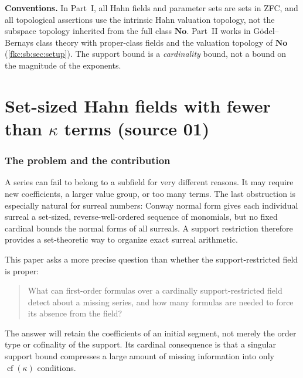 \documentclass[11pt,letterpaper]{article}
\numberwithin{equation}{section}
\theoremstyle{definition}
\theoremstyle{remark}
\newcommand{\No}{\mathbf{No}}
\newcommand{\cf}{\operatorname{cf}}
\begin{document}
\begin{abstract}
The report is built from two manuscripts: Part~I (Sections 1--12) from one pinned at repository commit \texttt{465a54b}, Part~II (Sections 13--26) from one pinned at \texttt{343dc2c}.  record their provenance, notation conventions and relation to neighbouring reports; \cref{fkc:subsec:nonclaims,fkc:sb:sub:nonclaims} collect their non-claims.
\end{abstract}
\vfill
\noindent\small\textbf{Conventions.} In Part~I, all Hahn fields and parameter sets are sets in ZFC, and all topological assertions use the intrinsic Hahn valuation topology, not the subspace topology inherited from the full class $\No$. Part~II works in G\"odel--Bernays class theory with proper-class fields and the valuation topology of $\No$ (\cref{fkc:sb:sec:setup}). The support bound is a \emph{cardinality} bound, not a bound on the magnitude of the exponents.
\clearpage
\begingroup
\small
\setlength{\parskip}{0pt}
\tableofcontents
\endgroup
\clearpage

\part{Set-sized Hahn fields with fewer than \texorpdfstring{$\kappa$}{kappa} terms (source 01)}
\label{fkc:sb:part:set}

\section{The problem and the contribution}
\label{fkc:sec:intro}

A series can fail to belong to a subfield for very different reasons. It may require new coefficients, a larger value group, or too many terms. The last obstruction is especially natural for surreal numbers: Conway normal form gives each individual surreal a set-sized, reverse-well-ordered sequence of monomials, but no fixed cardinal bounds the normal forms of all surreals. A support restriction therefore provides a set-theoretic way to organize exact surreal arithmetic.

This paper asks a more precise question than whether the support-restricted field is proper:
\begin{quote}
What can first-order formulas over a cardinally support-restricted field detect about a missing series, and how many formulas are needed to force its absence from the field?
\end{quote}
The answer will retain the coefficients of an initial segment, not merely the order type or cofinality of the support. Its cardinal consequence is that a singular support bound compresses a large amount of missing information into only $\cf(\kappa)$ conditions.
\end{document}
